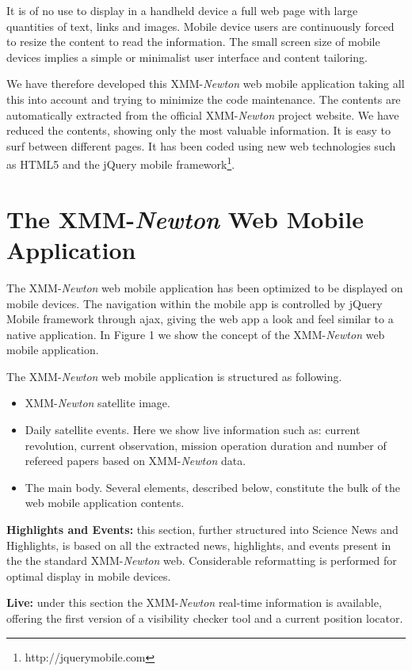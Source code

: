 It is of no use to display in a handheld device a full web page with
large quantities of text, links and images. Mobile device users are
continuously forced to resize the content to read the information. The
small screen size of mobile devices implies a simple or minimalist user
interface and content tailoring.

We have therefore developed this XMM-{\em Newton} web mobile application taking
all this into account and trying to minimize the code maintenance. The
contents are automatically extracted from the official XMM-{\em Newton} project
website. We have reduced the contents, showing only the most valuable
information. It is easy to surf between different pages. It has been
coded using new web technologies such as HTML5 and the jQuery mobile
framework\footnote{http://jquerymobile.com}.

\section{The XMM-{\em Newton} Web Mobile Application}

The XMM-{\em Newton} web mobile application has been optimized to be displayed on
mobile devices. The navigation within the mobile app is controlled by
jQuery Mobile framework through ajax, giving the web app a look and
feel similar to a native application. In Figure 1 we show the concept
of the XMM-{\em Newton} web mobile application.

The XMM-{\em Newton} web mobile application is structured as following.
\begin{itemize}
\item XMM-{\em Newton} satellite image.
\item Daily satellite events. Here we show live information such as: current revolution, 
current observation, mission operation duration and number of refereed papers based on 
XMM-{\em Newton} data.
\item The main body. Several elements, described below, constitute the 
bulk of the web mobile application contents.
\end{itemize}

{\bf Highlights and Events:} this section, further structured into
Science News and Highlights, is based on all the extracted news,
highlights, and events present in the the standard XMM-{\em Newton}
web. Considerable reformatting is performed for optimal display in
mobile devices.

{\bf Live:} under this section the XMM-{\em Newton} real-time information is available,
offering the first version of a visibility checker tool and a current
position locator.

